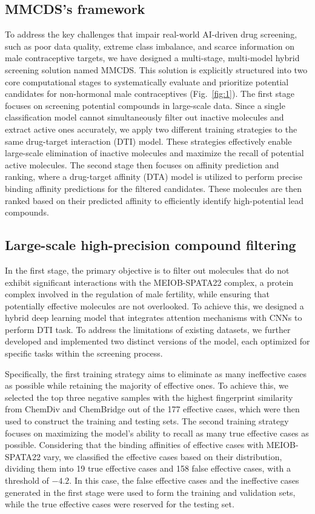 \documentclass[unnumsec,webpdf,contemporary,large]{oup-authoring-template}%
\theoremstyle{thmstyleone}%
\theoremstyle{thmstyletwo}%
\theoremstyle{thmstylethree}%
\begin{document}
\subsection*{MMCDS's framework}

To address the key challenges that impair real-world AI-driven drug screening, such as poor data quality, extreme class imbalance, and scarce information on male contraceptive targets, we have designed a multi-stage, multi-model hybrid screening solution named MMCDS. This solution is explicitly structured into two core computational stages to systematically evaluate and prioritize potential candidates for non-hormonal male contraceptives (Fig.~\ref{fig:1}). The first stage focuses on screening potential compounds in large-scale data. Since a single classification model cannot simultaneously filter out inactive molecules and extract active ones accurately, we apply two different training strategies to the same drug-target interaction (DTI) model. These strategies effectively enable large-scale elimination of inactive molecules and maximize the recall of potential active molecules. The second stage then focuses on affinity prediction and ranking, where a drug-target affinity (DTA) model is utilized to perform precise binding affinity predictions for the filtered candidates. These molecules are then ranked based on their predicted affinity to efficiently identify high-potential lead compounds.

\subsection*{Large-scale high-precision compound filtering} %

In the first stage, the primary objective is to filter out molecules that do not exhibit significant interactions with the MEIOB-SPATA22 complex, a protein complex involved in the regulation of male fertility, while ensuring that potentially effective molecules are not overlooked. To achieve this, we designed a hybrid deep learning model that integrates attention mechanisms with CNNs to perform DTI task. To address the limitations of existing datasets, we further developed and implemented two distinct versions of the model, each optimized for specific tasks within the screening process.

Specifically, the first training strategy aims to eliminate as many ineffective cases as possible while retaining the majority of effective ones. To achieve this, we selected the top three negative samples with the highest fingerprint similarity from ChemDiv and ChemBridge out of the 177 effective cases, which were then used to construct the training and testing sets. The second training strategy focuses on maximizing the model's ability to recall as many true effective cases as possible. Considering that the binding affinities of effective cases with MEIOB-SPATA22 vary, we classified the effective cases based on their distribution, dividing them into 19 true effective cases and 158 false effective cases, with a threshold of $-4.2$. In this case, the false effective cases and the ineffective cases generated in the first stage were used to form the training and validation sets, while the true effective cases were reserved for the testing set.
\end{document}
